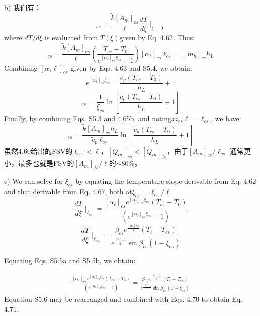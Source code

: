 b) 我们有：
\begin{equation}
[Q_{in}]_{cs}=\frac{\tilde{k}[A_m]_{cs}}{\ell}\frac{dT}{d\xi}\mid_{\xi=0}
\end{equation}
where $dT/d\xi$ is evaluated from $T(\xi)$given by Eq. 4.62. Thus:
\begin{equation}
[Q_{in}]_{cs}=\frac{\tilde{k}[A_m]_{cs}}{\ell}(\frac{T_{cs}-T_0}{e^{[\alpha_\ell]_{cs}\xi_{cs}}-1})[\alpha_\ell]_{cs}\ell_{cs}=[\dot{m}_h]_{cs}h_L
\end{equation}
Combining $[\alpha_{1}\ell]_{cs}$ given by Eqs. 4.63 and S5.4, we obtain:
\begin{equation}%
e^{[\alpha_\ell]_{cs}\xi_{cs}}=\frac{\tilde{c}_p(T_{cs}-T_0)}{h_L}+1
\end{equation}
\begin{equation}%
[\alpha_\ell]_{cs}=\frac{1}{\xi_{cs}}\ln[\frac{\tilde{c}_p(T_{cs}-T_0)}{h_L}+1]
\end{equation}
Finally, by combining Eqs. S5.3 and 4.65b, and noting$xi_{cs}\ell=\ell_{cs}$, we have:
\begin{equation}%
[Q_{in}]_{cs}=\frac{\tilde{k}[A_m]_{cs}h_L}{\tilde{c}_p\ell_{cs}}\ln[\frac{\tilde{c}_p(T_{cs}-T_0)}{h_L}+1]
\end{equation}
虽然4.60给出的FSV的$\ell_{cs}<\ell$，$[Q_{in}]_{cs}<[Q_{in}]_{fs}$，由于$[A_m]_{cs}/\ell_{cs}$
通常更小，最多也就是FSV的$[A_m]_{fs}/\ell$的$\sim 80\%$。


c) We can solve for $\xi_{cs}$ by equating the temperature slope derivable from Eq. 4.62
and that derivable from Eq. 4.67, both at$\xi_{cs}=\ell_{cs}/\ell$
\begin{equation}
\frac{dT}{d\xi}\mid_{\ell_{cs}}=\frac{[\alpha_\ell]_{cs}e^{[\alpha_\ell]_{cs}\xi_{cs}}(T_{cs}-T_0)}{(e^{[\alpha_\ell]_{cs}\xi_{cs}}-1)}
\end{equation}
\begin{equation}
\frac{dT}{d\xi}\mid_{\ell_{cs}}=\frac{\beta_{cs}e^{\frac{[\alpha_\ell]{cs}}{2}}(T_\ell-T_{cs})}{e^{\frac{[\alpha_\ell]_{cs}}{2}}\sin\beta_{cs}(1-\xi_{cs})}
\end{equation}

Equating Eqs. S5.5a and S5.5b, we obtain:

\begin{align*}
\frac{[\alpha_\ell]_{cs}e^{[\alpha_\ell]_{cs}\xi_{cs}}(T_{cs}-T_0)}{(e^{[\alpha_\ell]_{cs}\xi_{cs}}-1)}
=\frac{\beta_{cs}e^{\frac{[\alpha_\ell]_{cs}\xi_{cs}}{2}}(T_\ell-T_{cs})}{e^{\frac{[\alpha_\ell]_{cs}}{2}}\sin\beta_{cs}(1-\xi_{cs})} \tag{S5.6}
\end{align*}
Equation S5.6 may be rearranged and combined with Eqs. 4.70 to obtain Eq. 4.71.

